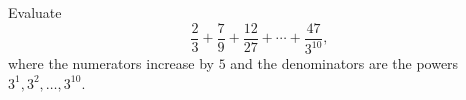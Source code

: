 Evaluate
\[
\dfrac{2}{3}+\dfrac{7}{9}+\dfrac{12}{27}+\cdots+\dfrac{47}{3^{10}},
\]
where the numerators increase by $5$ and the denominators are the powers $3^1,3^2,\dots,3^{10}$.
